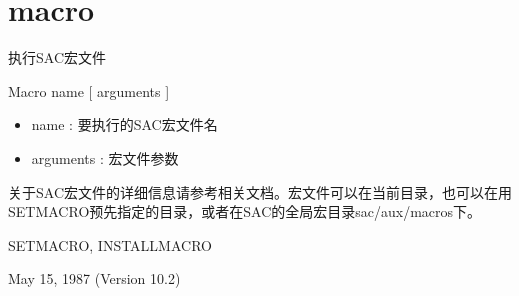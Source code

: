 \section{macro}
\label{cmd:macro}

执行SAC宏文件

Macro name [ arguments ]

\begin{itemize}
\item name : 要执行的SAC宏文件名
\item arguments : 宏文件参数
\end{itemize}

关于SAC宏文件的详细信息请参考相关文档。宏文件可以在当前目录，也可以在用SETMACRO预先指定的目录，或者在SAC的全局宏目录sac/aux/macros下。

SETMACRO, INSTALLMACRO

May 15, 1987 (Version 10.2)
